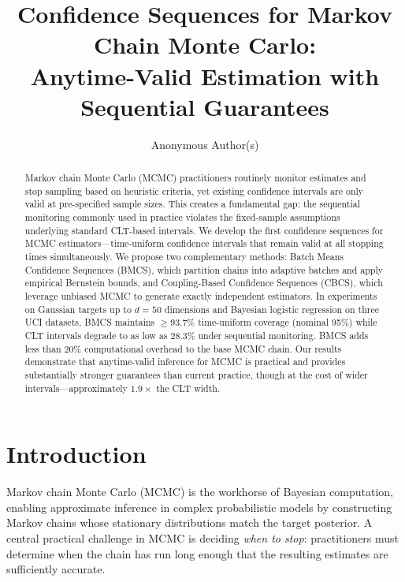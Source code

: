 \documentclass[11pt]{article}
\title{Confidence Sequences for Markov Chain Monte Carlo:\\ Anytime-Valid Estimation with Sequential Guarantees}
\author{
  Anonymous Author(s)
}
\date{}
\begin{document}
\maketitle

\begin{abstract}
Markov chain Monte Carlo (MCMC) practitioners routinely monitor estimates and stop sampling based on heuristic criteria, yet existing confidence intervals are only valid at pre-specified sample sizes. This creates a fundamental gap: the sequential monitoring commonly used in practice violates the fixed-sample assumptions underlying standard CLT-based intervals. We develop the first confidence sequences for MCMC estimators---time-uniform confidence intervals that remain valid at all stopping times simultaneously. We propose two complementary methods: Batch Means Confidence Sequences (BMCS), which partition chains into adaptive batches and apply empirical Bernstein bounds, and Coupling-Based Confidence Sequences (CBCS), which leverage unbiased MCMC to generate exactly independent estimators. In experiments on Gaussian targets up to $d=50$ dimensions and Bayesian logistic regression on three UCI datasets, BMCS maintains $\geq 93.7\%$ time-uniform coverage (nominal 95\%) while CLT intervals degrade to as low as 28.3\% under sequential monitoring. BMCS adds less than 20\% computational overhead to the base MCMC chain. Our results demonstrate that anytime-valid inference for MCMC is practical and provides substantially stronger guarantees than current practice, though at the cost of wider intervals---approximately $1.9\times$ the CLT width.
\end{abstract}

\section{Introduction}

Markov chain Monte Carlo (MCMC) is the workhorse of Bayesian computation, enabling approximate inference in complex probabilistic models by constructing Markov chains whose stationary distributions match the target posterior. A central practical challenge in MCMC is deciding \emph{when to stop}: practitioners must determine when the chain has run long enough that the resulting estimates are sufficiently accurate.
\end{document}
